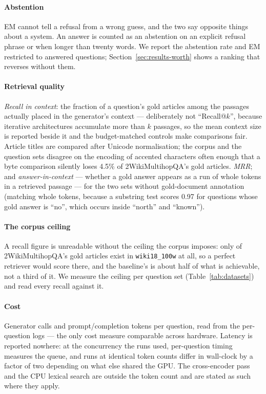 \paragraph{Abstention} EM cannot tell a refusal from a wrong guess, and
the two say opposite things about a system. An answer is counted as an
abstention on an explicit refusal phrase or when longer than twenty words.
We report the abstention rate and EM restricted to answered
questions; Section~\ref{sec:results-worth} shows a ranking that reverses
without them.

\paragraph{Retrieval quality} \emph{Recall in context}: the fraction of a
question's gold articles among the passages actually placed in the
generator's context --- deliberately not ``Recall@$k$'', because iterative
architectures accumulate more than $k$ passages, so the mean context size
is reported beside it and the budget-matched controls make comparisons
fair. Article titles are compared after Unicode normalisation; the corpus
and the question sets disagree on the encoding of accented characters
often enough that a byte comparison silently loses 4.5\% of
2WikiMultihopQA's gold articles. \emph{MRR}; and \emph{answer-in-context}
--- whether a gold answer appears as a run of whole tokens in a retrieved
passage --- for the two sets without gold-document annotation (matching
whole tokens, because a substring test scores 0.97 for questions whose
gold answer is ``no'', which occurs inside ``north'' and ``known'').

\paragraph{The corpus ceiling} A recall figure is unreadable without the
ceiling the corpus imposes: only \CoverageTwoWikiRecallCeiling{} of
2WikiMultihopQA's gold articles exist in \texttt{wiki18\_100w} at all, so
a perfect retriever would score \CoverageTwoWikiRecallCeiling{} there, and
the baseline's \NaiveRAGTwoWikiRecallInContext{} is about half of what is
achievable, not a third of it. We measure the ceiling per question set
(Table~\ref{tab:datasets}) and read every recall against it.

\paragraph{Cost} Generator calls and prompt/completion tokens per
question, read from the per-question logs --- the only cost measure
comparable across hardware. Latency is reported nowhere: at the
concurrency the runs used, per-question timing measures the queue, and
runs at identical token counts differ in wall-clock by a factor of two
depending on what else shared the GPU. The cross-encoder pass and the CPU
lexical search are outside the token count and are stated as such
where they apply.

